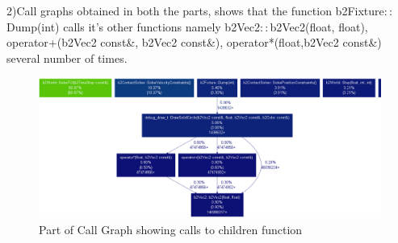 \documentclass[a4paper,11pt]{article}
\begin{document}
{{2)Call graphs obtained in both the parts, shows that the function b2Fixture$::$Dump(int) calls it's other functions namely b2Vec2$::$b2Vec2(float, float), operator+(b2Vec2 const\&, b2Vec2 const\&), operator*(float,b2Vec2 const\&) several number of times.

\begin{figure}[h]
    \centering
    \includegraphics[scale=0.4]{debug_part}
    \caption{Part of Call Graph showing calls to children function}
\end{figure}


}

}

\newpage
\end{document}
